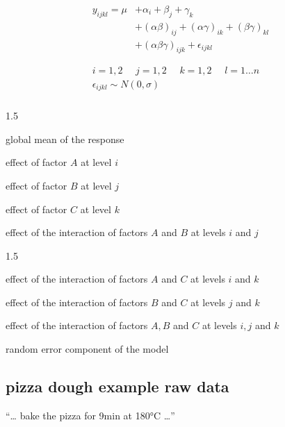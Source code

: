 \documentclass[
  a4paper,
]{scrbook}
\let\olddescription\description
\let\endolddescription\enddescription
\renewenvironment{description}{
          \begin{spacing}{1.5}\olddescription
        }{
          \endolddescription\end{spacing}
        }
\begin{document}
\begin{align}
\begin{split}
y_{ijkl} = \mu &+ \alpha_i + \beta_j + \gamma_k\\
&+ (\alpha\beta)_{ij} + (\alpha\gamma)_{ik} + (\beta\gamma)_{kl}\\
&+(\alpha\beta\gamma)_{ijk}+\epsilon_{ijkl} \\
\end{split}\\
\begin{split}
i = 1,2 \phantom{=} j = 1,2 \phantom{=} k = 1,2 \phantom{=} l = 1 \ldots n \\
\epsilon_{ijkl} \sim N(0,\sigma)
\end{split} \nonumber \\
\end{align}

\begin{description}
\item[\(\mu\)]
global mean of the response
\item[\(\alpha_i\)]
effect of factor \(A\) at level \(i\)
\item[\(\beta_j\)]
effect of factor \(B\) at level \(j\)
\item[\(\gamma_k\)]
effect of factor \(C\) at level \(k\)
\item[\((\alpha\beta)_{ij}\)]
effect of the interaction of factors \(A\) and \(B\) at levels \(i\) and
\(j\)
\end{description}

\begin{description}
\item[\((\alpha\gamma)_{ik}\)]
effect of the interaction of factors \(A\) and \(C\) at levels \(i\) and
\(k\)
\item[\((\beta\gamma)_{jk}\)]
effect of the interaction of factors \(B\) and \(C\) at levels \(j\) and
\(k\)
\item[\((\alpha\beta\gamma)_{ijk}\)]
effect of the interaction of factors \(A,B\) and \(C\) at levels \(i,j\)
and \(k\)
\item[\(\epsilon_{ijkl}\)]
random error component of the model
\end{description}

\subsection{pizza dough example raw
data}\label{pizza-dough-example-raw-data}

``\ldots{} bake the pizza for 9min at 180°C \ldots{}''
\end{document}
